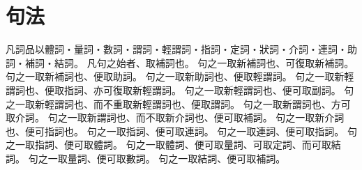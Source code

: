 \chapter{句法}
凡詞品以體詞・量詞・數詞・謂詞・輕謂詞・指詞・定詞・狀詞・介詞・連詞・助詞・補詞・結詞。
凡句之始者、取補詞也。
句之一取新補詞也、可復取新補詞。
句之一取新補詞也、便取助詞。
句之一取新助詞也、便取輕謂詞。
句之一取新輕謂詞也、便取指詞、亦可復取新輕謂詞。
句之一取新輕謂詞也、便可取副詞。
句之一取新輕謂詞也、而不重取新輕謂詞也、便取謂詞。
句之一取新謂詞也、方可取介詞。
句之一取新謂詞也、而不取新介詞也、便可取補詞。
句之一取新介詞也、便可指詞也。
句之一取指詞、便可取連詞。
句之一取連詞、便可取指詞。
句之一取指詞、便可取體詞。
句之一取體詞、便可取量詞、可取定詞、而可取結詞。
句之一取量詞、便可取數詞。
句之一取結詞、便可取補詞。
